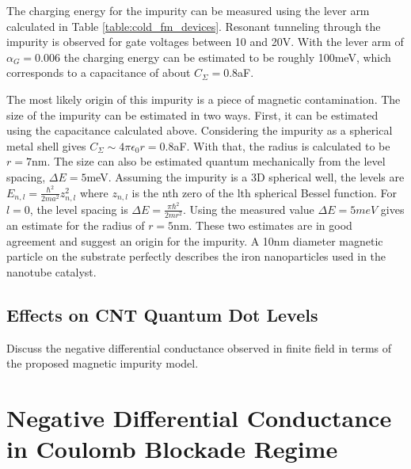 
The charging energy for the impurity can be measured using the lever arm calculated in Table \ref{table:cold_fm_devices}. Resonant tunneling through the impurity is observed for gate voltages between 10 and 20V. With the lever arm of $\alpha_G = 0.006$ the charging energy can be estimated to be roughly 100meV, which corresponds to a capacitance of about $C_{\Sigma} = 0.8$aF. 

The most likely origin of this impurity is a piece of magnetic contamination. The size of the impurity can be estimated in two ways. First, it can be estimated using the capacitance calculated above. Considering the impurity as a spherical metal shell gives $C_{\Sigma} \sim 4\pi \epsilon_0 r = 0.8$aF. With that, the radius is calculated to be $r = 7$nm. The size can also be estimated quantum mechanically from the level spacing, $\Delta E = 5$meV. Assuming the impurity is a 3D spherical well, the levels are $E_{n,l} = \frac{\hbar^2}{2ma^2}z_{n,l}^2$ where $z_{n,l}$ is the nth zero of the lth spherical Bessel function. For $l=0$, the level spacing is $\Delta E = \frac{\pi \hbar^2}{2mr^2}$. Using the measured value $\Delta E = 5meV$ gives an estimate for the radius of $r = 5$nm. These two estimates are in good agreement and suggest an origin for the impurity. A 10nm diameter magnetic particle on the substrate perfectly describes the iron nanoparticles used in the nanotube catalyst.


\subsection{Effects on CNT Quantum Dot Levels}

Discuss the negative differential conductance observed in finite field in terms of the proposed magnetic impurity model.

\section{Negative Differential Conductance in Coulomb Blockade Regime}

